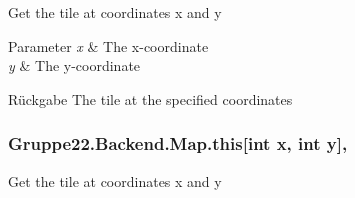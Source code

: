 Get the tile at coordinates x and y 


\begin{DoxyParams}{Parameter}
{\em x} & The x-\/coordinate\\
\hline
{\em y} & The y-\/coordinate\\
\hline
\end{DoxyParams}
\begin{DoxyReturn}{Rückgabe}
The tile at the specified coordinates
\end{DoxyReturn}
\hypertarget{class_gruppe22_1_1_backend_1_1_map_a51c56c902b3c7d2ee1e324b59ee89f8a}{
\subsubsection[{this[int x, int y]}]{ Gruppe22.\-Backend.\-Map.\-this\mbox{[}int x, int y\mbox{]}\hspace{0.3cm}{\ttfamily [get]}, {\ttfamily [set]}}}\label{class_gruppe22_1_1_backend_1_1_map_a51c56c902b3c7d2ee1e324b59ee89f8a}


Get the tile at coordinates x and y 


